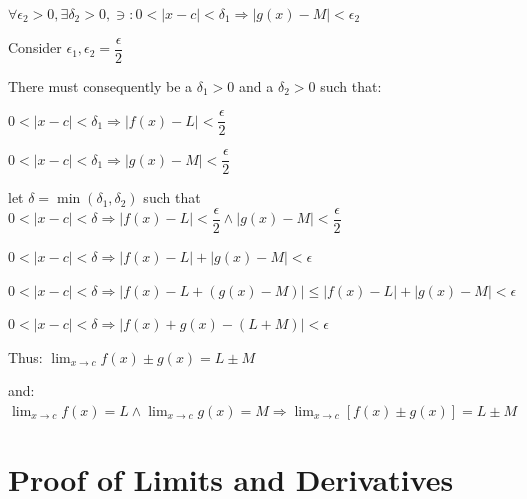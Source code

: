\documentclass{article}
\begin{document}
$\forall \epsilon_2 > 0, \exists \delta_2 > 0, \ni : 0 < |x - c| <\delta_1 \Longrightarrow |g(x) - M| < \epsilon_2$

Consider $\epsilon_1, \epsilon_2 = \dfrac{\epsilon}{2}$

There must consequently be a $\delta_1 > 0$ and a $\delta_2 > 0$ such that:

$0 < |x - c| < \delta_1 \Longrightarrow |f(x) - L| < \dfrac{\epsilon}{2}$

$0 < |x - c| < \delta_1 \Longrightarrow |g(x) - M| < \dfrac{\epsilon}{2}$

let $\delta = \min(\delta_1, \delta_2) $ such that $ 0 <|x - c| < \delta \Longrightarrow |f(x) - L| < \dfrac{\epsilon}{2} \land |g(x) - M| < \dfrac{\epsilon}{2}$

$0 <|x - c| < \delta \Longrightarrow |f(x) - L| + |g(x) - M| < \epsilon$

$0 <|x - c| < \delta \Longrightarrow |f(x) - L + (g(x) - M)| \leq |f(x) - L| + |g(x) - M| < \epsilon$

$0 <|x - c| < \delta \Longrightarrow |f(x) + g(x) - (L + M)| < \epsilon$

\vspace{0.3cm}

Thus: $\displaystyle \lim_{x\to c} f(x) \pm g(x) = L \pm M$

and: $\displaystyle \lim_{x \to c} f(x) = L \land \lim_{x \to c} g(x) = M \Longrightarrow \lim_{x \to c} [f(x) \pm g(x)] = L \pm M$ 

\section{Proof of Limits and Derivatives}
\end{document}
